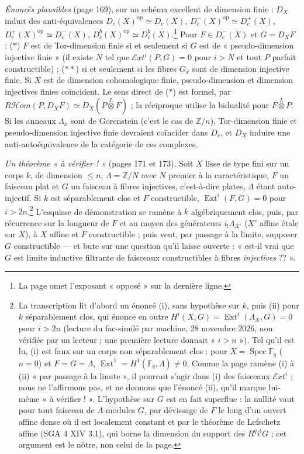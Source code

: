 \documentclass[11pt,a4paper]{article}
\begin{document}
\emph{Énoncés plausibles} (page 169), sur un schéma excellent de dimension
finie : $D_{X}$ induit des anti-équivalences $D_{c}(X)^{\mathrm{op}} \simeq
D_{c}(X)$, $D^{-}_{c}(X)^{\mathrm{op}} \simeq D^{+}_{c}(X)$,
$D^{+}_{c}(X)^{\mathrm{op}} \simeq D^{-}_{c}(X)$,
$D^{b}_{c}(X)^{\mathrm{op}} \simeq D^{b}_{c}(X)$.\footnote{La page omet
l'exposant « opposé » sur la dernière ligne.} Pour $F \in D^{-}_{c}(X)$ et $G =
D_{X}F$ : ($\ast$) $F$ est de Tor-dimension finie si et seulement si $G$ est de
« pseudo-dimension injective finie » (il existe $N$ tel que
$\mathcal{E}xt^{i}(P, G) = 0$ pour $i > N$ et tout $P$ parfait constructible) ;
($\ast\ast$) si et seulement si les fibres $G_{\bar x}$ sont de dimension
injective finie. Si $X$ est de dimension cohomologique finie, pseudo-dimension
et dimension injectives finies coïncident. Le sens direct de ($\ast$) est
formel, par $R\mathcal{H}om(P, D_{X}F) \simeq D_{X}(P \overset{L}{\otimes} F)$ ;
la réciproque utilise la bidualité pour $F \overset{L}{\otimes} P$. Si les
anneaux $\Lambda_{\bar x}$ sont de Gorenstein (c'est le cas de
$\mathbb{Z}/n$), Tor-dimension finie et pseudo-dimension injective finie
devraient coïncider dans $D_{c}$, et $D_{X}$ induire une anti-autoéquivalence
de la catégorie de ces complexes.

\emph{Un théorème « à vérifier ! »} (pages 171 et 173). Soit $X$ lisse de type
fini sur un corps $k$, de dimension $\leq n$, $\Lambda = \mathbb{Z}/N$ avec $N$
premier à la caractéristique, $F$ un faisceau plat et $G$ un faisceau à fibres
injectives, c'est-à-dire plates, $\Lambda$ étant auto-injectif. Si $k$ est
séparablement clos et $F$ constructible, $\operatorname{Ext}^{i}(F, G) = 0$
pour $i > 2n$.\footnote{La transcription lit d'abord un énoncé (i), sans
hypothèse sur $k$, puis (ii) pour $k$ séparablement clos, qui énonce en outre
$H^{i}(X, G) = \operatorname{Ext}^{i}(\Lambda_{X}, G) = 0$ pour $i > 2n$
(lecture du fac-similé par machine, 28 novembre 2026, non vérifiée par un
lecteur ; une première lecture donnait « $i > n$ »). Tel qu'il est lu, (i) est faux sur
un corps non séparablement clos : pour $X = \operatorname{Spec}\mathbb{F}_{q}$
($n = 0$) et $F = G = \Lambda$, $\operatorname{Ext}^{1} = H^{1}(\mathbb{F}_{q},
\Lambda) \neq 0$. Comme la page ramène (i) à (ii) « par passage à la limite »,
il pourrait s'agir dans (i) des faisceaux $\mathcal{E}xt^{i}$ ; nous ne
l'affirmons pas, et ne donnons que l'énoncé (ii), qu'il marque lui-même « à
vérifier ! ». L'hypothèse sur $G$ est en fait superflue : la nullité vaut pour
tout faisceau de $\Lambda$-modules $G$, par dévissage de $F$ le long d'un ouvert
affine dense où il est localement constant et par le théorème de Lefschetz
affine (SGA 4 XIV 3.1), qui borne la dimension du support des
$R^{q}i^{!}G$ ; cet argument est le nôtre, non celui de la page.} L'esquisse de démonstration se ramène à $k$ algébriquement clos,
puis, par récurrence sur la longueur de $F$ et au moyen des générateurs
$i_{!}\Lambda_{X'}$ ($X'$ affine étale sur $X$), à $X$ affine et $F$
constructible ; puis veut, par passage à la limite, supposer $G$ constructible
--- et bute sur une question qu'il laisse ouverte : « est-il vrai que $G$ est
limite inductive filtrante de faisceaux constructibles à fibres
\emph{injectives} ?? ».
\end{document}
